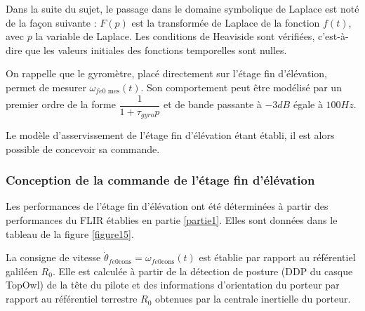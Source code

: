 
Dans la suite du sujet, le passage dans le domaine symbolique de Laplace est noté de la façon suivante : $F(p)$
est la transformée de Laplace de la fonction $f(t)$, avec $p$ la variable de Laplace. Les conditions de Heaviside sont
vérifiées, c'est-à-dire que les valeurs initiales des fonctions temporelles sont nulles.


On rappelle que le gyromètre, placé directement sur l'étage fin d'élévation, permet de mesurer $\omega_{fe0\text{ mes}}(t)$. Son comportement peut être modélisé par un premier ordre de la forme $\dfrac{1}{1+\tau_{gyro}p}$ et de bande passante à $-3 dB$ égale à $100 Hz$.




Le modèle d'asservissement de l'étage fin d'élévation étant établi, il est alors possible de concevoir sa commande.

\FloatBarrier
\subsubsection{Conception de la commande de l'étage fin d'élévation}

Les performances de l'étage fin d'élévation ont été déterminées à partir des performances du FLIR établies en
partie \ref{partie1}. Elles sont données dans le tableau de la figure \ref{figure15}.

La consigne de vitesse $\dot{\theta}_{fe0\text{cons}}=\omega_{fe0\text{cons}}(t)$ est établie par rapport au référentiel galiléen $R_0$. Elle est calculée à partir de la détection de posture (DDP du casque TopOwl) de la tête du pilote et des informations
d'orientation du porteur par rapport au référentiel terrestre $R_0$ obtenues par la centrale inertielle du porteur.

